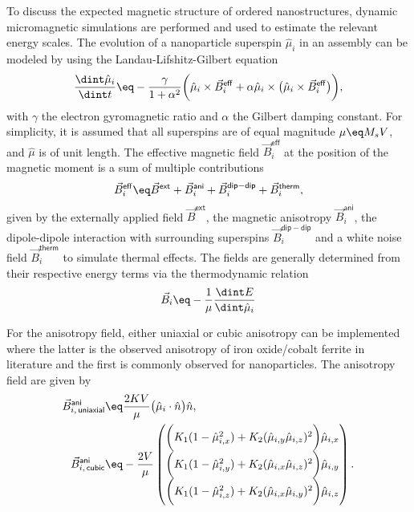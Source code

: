 \documentclass[\main/dresen_thesis.tex]{subfiles}
\begin{document}
  To discuss the expected magnetic structure of ordered nanostructures, dynamic micromagnetic simulations are performed and used to estimate the relevant energy scales.
  The evolution of a nanoparticle superspin $\hat{\mu}_i$ in an assembly can be modeled by using the Landau-Lifshitz-Gilbert equation
  \begin{align}
    \frac{\dint \hat{\mu}_i}{\dint t} \eq - \frac{\gamma}{1 + \alpha^2} \biggl( \hat{\mu}_i \times \vec{B}_i^\mathsf{eff} + \alpha \hat{\mu}_i \times \bigl(\hat{\mu}_i \times \vec{B}_i^\mathsf{eff} \bigr) \biggr),
  \end{align}
  with $\gamma$ the electron gyromagnetic ratio and $\alpha$ the Gilbert damping constant.
  For simplicity, it is assumed that all superspins are of equal magnitude $\mu \eq M_s V$, and $\hat{\mu}$ is of unit length.
  The effective magnetic field $\vec{B}_i^\mathsf{eff}$ at the position of the magnetic moment is a sum of multiple contributions
  \begin{align}
    \vec{B}_i^\mathsf{eff} \eq \vec{B}^\mathsf{ext} + \vec{B}^\mathsf{ani}_i + \vec{B}^\mathsf{dip-dip}_i + \vec{B}^\mathsf{therm}_i,
  \end{align}
  given by the externally applied field $\vec{B}^\mathsf{ext}$, the magnetic anisotropy $\vec{B}^\mathsf{ani}_i$, the dipole-dipole interaction with surrounding superspins $\vec{B}^\mathsf{dip-dip}_i$ and a white noise field $\vec{B}^\mathsf{therm}_i$ to simulate thermal effects.
  The fields are generally determined from their respective energy terms via the thermodynamic relation
  \begin{align}
    \vec{B}_i \eq - \frac{1}{\mu} \frac{\dint E}{\dint \hat{\mu}_i}
  \end{align}

  For the anisotropy field, either uniaxial or cubic anisotropy can be implemented where the latter is the observed anisotropy of iron oxide/cobalt ferrite in literature and the first is commonly observed for nanoparticles.
  The anisotropy field are given by
  \begin{align}
    \vec{B}^\mathsf{ani}_{i, \,\mathsf{uniaxial}} &\eq \frac{2 K V}{\mu} \bigl( \hat{\mu}_i \cdot \hat{n} \bigr) \hat{n},\\
    \vec{B}^\mathsf{ani}_{i, \,\mathsf{cubic}} &\eq -\frac{2 V}{\mu} \begin{pmatrix}
      \biggl(K_1 (1 - \hat{\mu}_{i, x}^2) + K_2 (\hat{\mu}_{i, y} \hat{\mu}_{i, z})^2 \biggr) \hat{\mu}_{i, x} \\
      \biggl(K_1 (1 - \hat{\mu}_{i, y}^2) + K_2 (\hat{\mu}_{i, x} \hat{\mu}_{i, z})^2 \biggr) \hat{\mu}_{i, y} \\
      \biggl(K_1 (1 - \hat{\mu}_{i, z}^2) + K_2 (\hat{\mu}_{i, x} \hat{\mu}_{i, y})^2 \biggr) \hat{\mu}_{i, z}
      \end{pmatrix}.
  \end{align}
\end{document}

